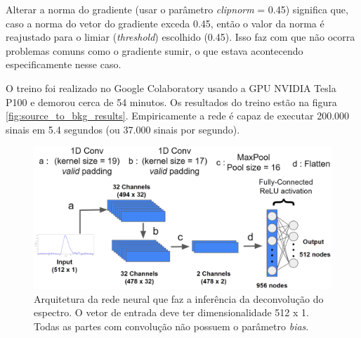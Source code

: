 \documentclass[a4paper,12pt,oneside]{book}
\begin{document}
\par Alterar a norma do gradiente (usar o parâmetro \textit{clipnorm} = 0.45) significa que, caso a norma do vetor do gradiente exceda 0.45, então o valor da norma é reajustado para o limiar (\textit{threshold}) escolhido (0.45). Isso faz com que não ocorra problemas comuns como o gradiente sumir\cite{VGP, ADAMAX}, o que estava acontecendo especificamente nesse caso.

\par O treino foi realizado no Google Colaboratory \cite{google_colab} usando a GPU NVIDIA Tesla P100 e demorou cerca de 54 minutos. Os resultados do treino estão na figura \ref{fig:source_to_bkg_results}. Empiricamente a rede é capaz de executar 200.000 sinais em 5.4 segundos (ou 37.000 sinais por segundo).

\begin{figure}[H]
    \centering
    \includegraphics[scale = 0.28]{figs/source_wobkg_to_deconv.png}
    \caption{Arquitetura da rede neural que faz a inferência da deconvolução do espectro. O vetor de entrada deve ter dimensionalidade 512 x 1. Todas as partes com convolução não possuem o parâmetro \textit{bias}.}
    \label{fig:source_to_deconv}
\end{figure}
\end{document}
